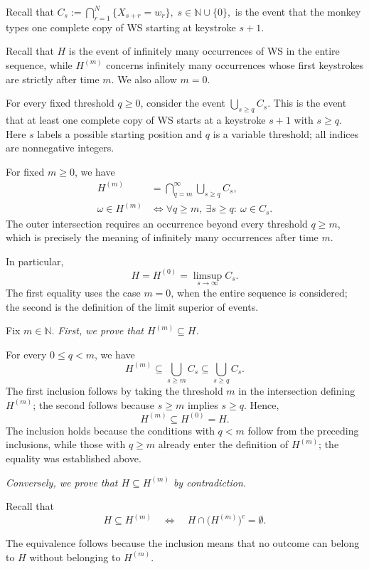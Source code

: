\documentclass[11pt,a4paper]{article}
\newcommand{\studyheading}[1]{{\color{StudyBlue}\normalfont\bfseries\boldmath #1}}
\newcommand{\studylabel}[1]{\textcolor{StudyBlue}{\textnormal{\bfseries #1}}}
\begin{document}
Recall that
$C_s:=\bigcap_{r=1}^{N}\{X_{s+r}=w_r\},
\; s\in\mathbb N\cup\{0\},$
is the event that the monkey types one complete copy of WS starting at keystroke $s+1$.

\noindent\studyheading{\studylabel{(i)}} Recall that $H$ is the event of infinitely many occurrences of WS in the entire sequence, while $H^{(m)}$ concerns infinitely many occurrences whose first keystrokes are strictly after time $m$. We also allow $m=0$.

For every fixed threshold $q\ge0$, consider the event $\bigcup_{s\ge q}C_s$. This is the event that at least one complete copy of WS starts at a keystroke $s+1$ with $s\ge q$. Here $s$ labels a possible starting position and $q$ is a variable threshold; all indices are nonnegative integers.

For fixed $m\ge0$, we have
\[
\begin{aligned}
H^{(m)}&=\bigcap_{q=m}^{\infty}\bigcup_{s\ge q}C_s,\\
\omega\in H^{(m)}&\iff\forall q\ge m,\ \exists s\ge q:\ \omega\in C_s.
\end{aligned}
\]
The outer intersection requires an occurrence beyond every threshold $q\ge m$, which is precisely the meaning of infinitely many occurrences after time $m$.

In particular,
\[
H=H^{(0)}=\limsup_{s\to\infty}C_s.
\]
The first equality uses the case $m=0$, when the entire sequence is considered; the second is the definition of the limit superior of events.

Fix $m\in\mathbb N$. \emph{First, we prove that $H^{(m)}\subseteq H$.}

For every $0\le q<m$, we have
\[
H^{(m)}\subseteq\bigcup_{s\ge m}C_s
\subseteq\bigcup_{s\ge q}C_s.
\]
The first inclusion follows by taking the threshold $m$ in the intersection defining $H^{(m)}$; the second follows because $s\ge m$ implies $s\ge q$. Hence,
\[
H^{(m)}\subseteq H^{(0)}=H.
\]
The inclusion holds because the conditions with $q<m$ follow from the preceding inclusions, while those with $q\ge m$ already enter the definition of $H^{(m)}$; the equality was established above.

\noindent\textit{Conversely, we prove that $H\subseteq H^{(m)}$ by contradiction.}

Recall that
\[
H\subseteq H^{(m)}
\quad\Longleftrightarrow\quad
H\cap\bigl(H^{(m)}\bigr)^c=\emptyset.
\]

The equivalence follows because the inclusion means that no outcome can belong to $H$ without belonging to $H^{(m)}$.
\end{document}
